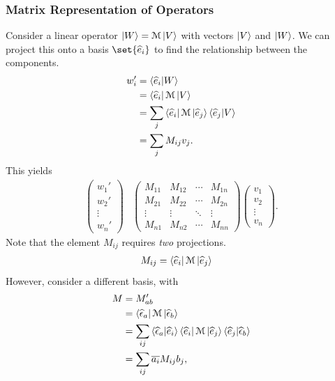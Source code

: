 \documentclass[10pt]{mypackage}
\begin{document}
\subsubsection{Matrix Representation of Operators}%
Consider a linear operator $\ket{W} = \mathcal{M}\ket{V}$ with vectors $\ket{V}$ and $\ket{W}$. We can project this onto a basis $\set{\widehat{e}_i}$ to find the relationship between the components.
\begin{align*}
  w_i' &= \braket{\widehat{e}_i}{W}\\
       &= \bra{\widehat{e}_i}\mathcal{M}\ket{V}\\
       &= \sum_{j}\bra{\widehat{e}_i}\mathcal{M}\ket{\widehat{e}_j}\braket{\widehat{e}_j}{V}\\
       &= \sum_{j} M_{ij}v_j.
\end{align*}
This yields
\begin{align*}
  \begin{pmatrix}w_1'\\w_2'\\\vdots\\w_n'\end{pmatrix} & \begin{pmatrix}M_{11} & M_{12} & \cdots & M_{1n}\\ M_{21} & M_{22} & \cdots & M_{2n} \\ \vdots & \vdots & \ddots & \vdots \\ M_{n1} & M_{n2} & \cdots & M_{nn}\end{pmatrix} \begin{pmatrix}v_1\\v_2\\\vdots\\v_n\end{pmatrix}.
\end{align*}
Note that the element $M_{ij}$ requires \textit{two} projections.
\begin{align*}
  M_{ij} &= \bra{\widehat{e}_i}\mathcal{M}\ket{\widehat{e}_j}
\end{align*}
However, consider a different basis, with
\begin{align*}
  M &= M_{ab}'\\
    &= \bra{\widehat{\epsilon}_a}\mathcal{M}\ket{\widehat{\epsilon}_b}\\
    &= \sum_{ij}\braket{\widehat{\epsilon}_{a}}{\widehat{e}_i}\bra{\widehat{e}_i}\mathcal{M}\ket{\widehat{e}_j}\braket{\widehat{e}_j}{\widehat{\epsilon}_b}\\
    &= \sum_{ij}\overline{a_i}M_{ij}b_j,
\end{align*}
\end{document}
